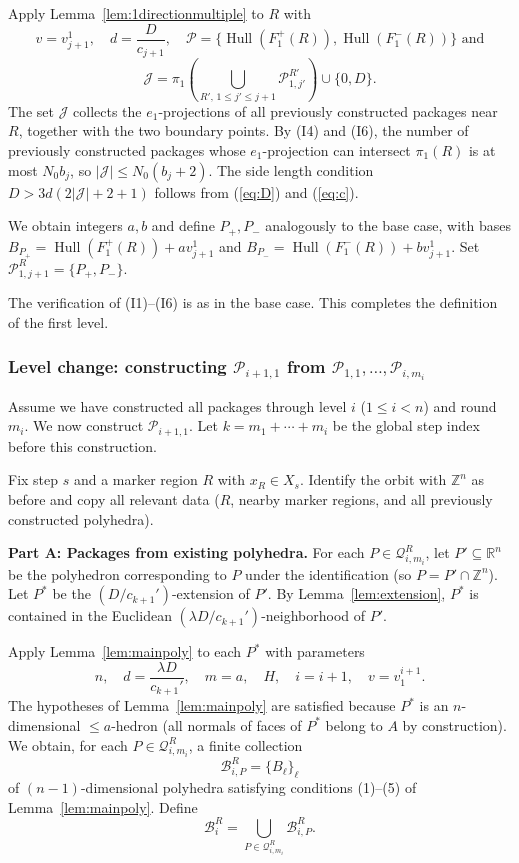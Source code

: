 \documentclass[10pt,a4paper]{amsart}
\DeclareMathOperator{\Hull}{Hull}
\begin{document}
Apply Lemma~\ref{lem:1directionmultiple} to $R$ with
\[
v=v_{j+1}^1,\quad d=\frac{D}{c_{j+1}},\quad
\mathcal{P}=\{\Hull(F_1^+(R)),\Hull(F_1^-(R))\} \text{ and}
\]
\[
\mathcal{J}=\pi_1\left (\bigcup_{R',\,1\leq j'\leq j+1}
\mathcal{P}_{1,j'}^{R'}\right )\cup\{0, D\}.
\]
The set $\mathcal{J}$ collects the $e_1$-projections of all previously
constructed packages near $R$, together with the two boundary points.
By (I4) and (I6), the number of previously constructed packages whose
$e_1$-projection can intersect $\pi_1(R)$ is at most $N_0 b_j$, so
$|\mathcal{J}|\leq N_0 (b_j+2)$. The side length condition
$D>3d(2|\mathcal{J}|+2+1)$ follows from (\ref{eq:D}) and (\ref{eq:c}).

We obtain integers $a,b$ and define $P_+, P_-$ analogously to the base
case, with bases $B_{P_+}=\Hull(F_1^+(R))+av_{j+1}^1$ and
$B_{P_-}=\Hull(F_1^-(R))+bv_{j+1}^1$. Set
$\mathcal{P}_{1,j+1}^R=\{P_+, P_-\}$.

The verification of (I1)--(I6) is as in the base case. This completes the definition of the first level.

\subsubsection{Level change: constructing $\mathcal{P}_{i+1,1}$ from
$\mathcal{P}_{1,1},\dots,\mathcal{P}_{i,m_i}$}

Assume we have constructed all packages through level $i$ ($1\leq i<n$)
and round $m_i$. We now construct $\mathcal{P}_{i+1,1}$. Let
$k=m_1+\cdots+m_i$ be the global step index before this construction.

Fix step $s$ and a marker region $R$ with $x_R\in X_s$. Identify the
orbit with $\mathbb{Z}^n$ as before and copy all relevant data ($R$,
nearby marker regions, and all previously constructed polyhedra).

\medskip\noindent
\textbf{Part A: Packages from existing polyhedra.}
For each $P\in\mathcal{Q}_{i,m_i}^R$, let $P'\subseteq\mathbb{R}^n$ be
the polyhedron corresponding to $P$ under the identification (so
$P=P'\cap\mathbb{Z}^n$). Let $P^*$ be the $(D/c_{k+1}')$-extension of
$P'$. By
Lemma~\ref{lem:extension}, $P^*$ is contained in the Euclidean
$(\lambda D/c_{k+1}')$-neighborhood of $P'$.

Apply Lemma~\ref{lem:mainpoly} to each $P^*$ with parameters
\[
n,\quad d=\frac{\lambda D}{c_{k+1}'},\quad m=a,\quad H,\quad
i=i+1,\quad v=v_1^{i+1}.
\]
The hypotheses of Lemma~\ref{lem:mainpoly} are satisfied because $P^*$
is an $n$-dimensional $\leq\!\! a$-hedron (all normals of faces of $P^*$ belong to $A$ by construction). We
obtain, for each $P\in\mathcal{Q}_{i,m_i}^R$, a finite collection
\[
\mathcal{B}_{i,P}^R=\{B_\ell\}_{\ell}
\]
of $(n-1)$-dimensional polyhedra satisfying conditions (1)--(5) of
Lemma~\ref{lem:mainpoly}. Define
\[
\mathcal{B}_{i}^R=\bigcup_{P\in\mathcal{Q}_{i,m_i}^R}
\mathcal{B}_{i,P}^R.
\]
\end{document}

